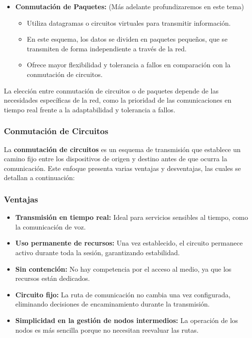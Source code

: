 \documentclass[a4paper,12pt]{article}
\begin{document}
\begin{itemize}
    \item \textbf{Conmutación de Paquetes:} (Más adelante profundizaremos en este tema)
    \begin{itemize}
        \item Utiliza datagramas o circuitos virtuales para transmitir información.
        \item En este esquema, los datos se dividen en paquetes pequeños, que se transmiten de forma independiente a través de la red.
        \item Ofrece mayor flexibilidad y tolerancia a fallos en comparación con la conmutación de circuitos.
    \end{itemize}
\end{itemize}

La elección entre conmutación de circuitos o de paquetes depende de las necesidades específicas de la red, como la prioridad de las comunicaciones en tiempo real frente a la adaptabilidad y tolerancia a fallos.

\subsubsection{Conmutación de Circuitos}

La \textbf{conmutación de circuitos} es un esquema de transmisión que establece un camino fijo entre los dispositivos de origen y destino antes de que ocurra la comunicación. Este enfoque presenta varias ventajas y desventajas, las cuales se detallan a continuación:

\subsubsection*{Ventajas}

\begin{itemize}
    \item \textbf{Transmisión en tiempo real:} Ideal para servicios sensibles al tiempo, como la comunicación de voz.
    \item \textbf{Uso permanente de recursos:} Una vez establecido, el circuito permanece activo durante toda la sesión, garantizando estabilidad.
    \item \textbf{Sin contención:} No hay competencia por el acceso al medio, ya que los recursos están dedicados.
    \item \textbf{Circuito fijo:} La ruta de comunicación no cambia una vez configurada, eliminando decisiones de encaminamiento durante la transmisión.
    \item \textbf{Simplicidad en la gestión de nodos intermedios:} La operación de los nodos es más sencilla porque no necesitan reevaluar las rutas.
\end{itemize}
\end{document}
